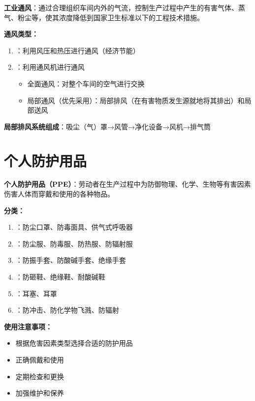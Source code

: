 \begin{defbox}
\textbf{工业通风}：通过合理组织车间内外的气流，控制生产过程中产生的有害气体、蒸气、粉尘等，使其浓度降低到国家卫生标准以下的工程技术措施。

\textbf{通风类型：}
\begin{enumerate}[leftmargin=*]
    \item {}：利用风压和热压进行通风（经济节能）
    \item {}：利用通风机进行通风
    \begin{itemize}
        \item 全面通风：对整个车间的空气进行交换
        \item 局部通风（优先采用）：局部排风（在有害物质发生源就地将其排出）和局部送风
    \end{itemize}
\end{enumerate}

\textbf{局部排风系统组成}：吸尘（气）罩→风管→净化设备→风机→排气筒
\end{defbox}

\section{个人防护用品}

\begin{defbox}
\textbf{个人防护用品（PPE）}：劳动者在生产过程中为防御物理、化学、生物等有害因素伤害人体而穿戴和使用的各种物品。

\textbf{分类：}
\begin{enumerate}[leftmargin=*]
    \item {}：防尘口罩、防毒面具、供气式呼吸器
    \item {}：防尘服、防毒服、防热服、防辐射服
    \item {}：防振手套、防酸碱手套、绝缘手套
    \item {}：防砸鞋、绝缘鞋、耐酸碱鞋
    \item {}：耳塞、耳罩
    \item {}：防冲击、防化学物飞溅、防辐射
\end{enumerate}

\textbf{使用注意事项：}
\begin{itemize}[leftmargin=*]
    \item 根据危害因素类型选择合适的防护用品
    \item 正确佩戴和使用
    \item 定期检查和更换
    \item 加强维护和保养
\end{itemize}
\end{defbox}

